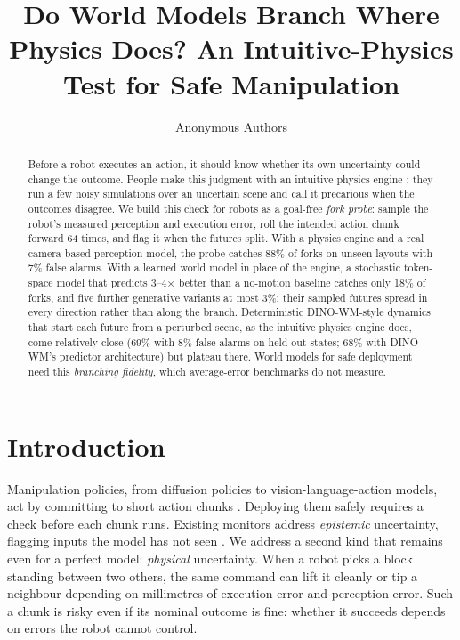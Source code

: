 \documentclass{article}
\title{Do World Models Branch Where Physics Does? An Intuitive-Physics Test for Safe Manipulation}
\author{Anonymous Authors}
\begin{document}
\maketitle

\begin{abstract}
Before a robot executes an action, it should know whether its own uncertainty could change the outcome.
People make this judgment with an intuitive physics engine \citep{battaglia2013simulation}: they run a
few noisy simulations over an uncertain scene and call it precarious when the outcomes disagree. We
build this check for robots as a goal-free \emph{fork probe}: sample the robot's measured perception and
execution error, roll the intended action chunk forward 64 times, and flag it when the futures split.
With a physics engine and a real camera-based perception model, the probe catches 88\% of forks on
unseen layouts with 7\% false alarms. With a learned world model in place of the engine, a stochastic
token-space model that predicts 3--4$\times$ better than a no-motion baseline catches only 18\% of forks,
and five further generative variants at most 3\%: their sampled futures spread in every direction rather
than along the branch. Deterministic DINO-WM-style dynamics that start each
future from a perturbed scene, as the intuitive physics engine does, come relatively close (69\% with 8\%
false alarms on held-out states; 68\% with DINO-WM's predictor architecture) but plateau there. World models for safe deployment need
this \emph{branching fidelity}, which average-error benchmarks do not measure.
\end{abstract}


\section{Introduction}
Manipulation policies, from diffusion policies to vision-language-action models, act by committing to
short action chunks \citep{chi2023diffusion,zhao2023act,black2024pi0}. Deploying them safely requires a
check before each chunk runs. Existing monitors address \emph{epistemic} uncertainty, flagging inputs the
model has not seen \citep{seo2025uncertainty,xu2025failure}. We address a second kind that remains even
for a perfect model: \emph{physical} uncertainty. When a robot picks a block standing between two
others, the same command can lift it cleanly or tip a neighbour depending on millimetres of execution error and
perception error. Such a chunk is risky even if its nominal outcome is fine: whether it succeeds depends on errors the
robot cannot control.
\end{document}
